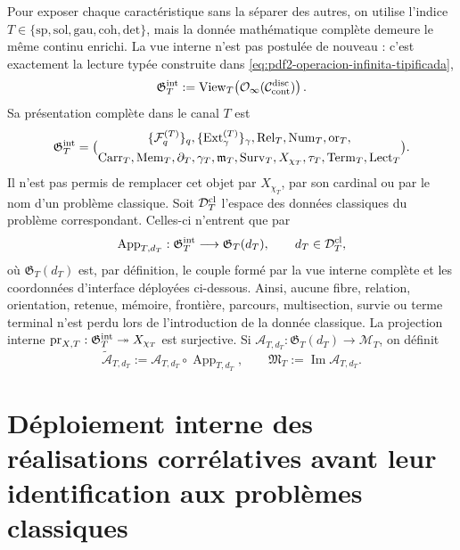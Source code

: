 Pour exposer chaque caractéristique sans la séparer des autres, on utilise l’indice $T\in\{\mathrm{sp},\mathrm{sol},\mathrm{gau},\mathrm{coh},\mathrm{det}\}$, mais la donnée mathématique complète demeure le même continu enrichi. La vue interne n’est pas postulée de nouveau : c’est exactement la lecture typée construite dans \eqref{eq:pdf2-operacion-infinita-tipificada},
\begin{equation}\label{eq:pdf2-g-t-desde-continuo}
 \mathfrak G_T^{\rm int}:=
 \operatorname{View}_T\!\left(
 \mathcal O_\infty(\mathcal C_{\rm cont}^{\rm disc})\right).
\end{equation}
Sa présentation complète dans le canal \(T\) est
\begin{equation}\label{eq:pdf2-g-t-completo}
 \mathfrak G_T^{\rm int}=
 \bigl(
 \begin{gathered}
 \{\mathcal F_q^{(T)}\}_q,
 \{\operatorname{Ext}_\gamma^{(T)}\}_\gamma,
 \operatorname{Rel}_T,\operatorname{Num}_T,\operatorname{or}_T,\\
 \operatorname{Carr}_T,\operatorname{Mem}_T,\partial_T,\gamma_T,
 \mathfrak m_T,\operatorname{Surv}_T,X_{\chi_T},\tau_T,
 \operatorname{Term}_T,\operatorname{Lect}_T
 \end{gathered}
 \bigr).
\end{equation}
Il n’est pas permis de remplacer cet objet par $X_{\chi_T}$, par son cardinal ou par le nom d’un problème classique. Soit $\mathcal D_T^{\rm cl}$ l’espace des données classiques du problème correspondant. Celles-ci n’entrent que par
\begin{equation}\label{eq:pdf2-mapa-preparacion-aplicacion}
 \operatorname{App}_{T,d_T}:\mathfrak G_T^{\rm int}\longrightarrow
 \mathfrak G_T(d_T),\qquad d_T\in\mathcal D_T^{\rm cl},
\end{equation}
où $\mathfrak G_T(d_T)$ est, par définition, le couple formé par la vue interne complète et les coordonnées d’interface déployées ci-dessous. Ainsi, aucune fibre, relation, orientation, retenue, mémoire, frontière, parcours, multisection, survie ou terme terminal n’est perdu lors de l’introduction de la donnée classique. La projection interne $\operatorname{pr}_{X,T}:\mathfrak G_T^{\rm int}\twoheadrightarrow X_{\chi_T}$ est surjective. Si $\mathcal A_{T,d_T}:\mathfrak G_T(d_T)\to\mathcal M_T$, on définit
\[
 \widetilde{\mathcal A}_{T,d_T}:=
 \mathcal A_{T,d_T}\circ\operatorname{App}_{T,d_T},
 \qquad
 \mathfrak M_T:=\operatorname{Im}\mathcal A_{T,d_T}.
\]

\section{Déploiement interne des réalisations corrélatives avant leur identification aux problèmes classiques}

